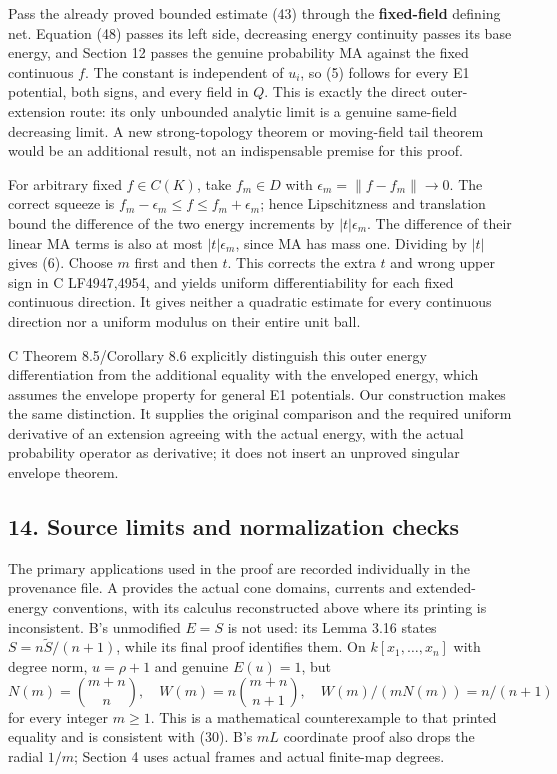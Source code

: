 \documentclass[
  10pt,
]{article}
\begin{document}
Pass the already proved bounded estimate (43) through the
\textbf{fixed-field} defining net. Equation (48) passes its left side,
decreasing energy continuity passes its base energy, and Section 12
passes the genuine probability MA against the fixed continuous \(f\).
The constant is independent of \(u_i\), so (5) follows for every E1
potential, both signs, and every field in \(Q\). This is exactly the
direct outer-extension route: its only unbounded analytic limit is a
genuine same-field decreasing limit. A new strong-topology theorem or
moving-field tail theorem would be an additional result, not an
indispensable premise for this proof.

For arbitrary fixed \(f\in C(K)\), take \(f_m\in D\) with
\(\epsilon_m=\|f-f_m\|\to0\). The correct squeeze is
\(f_m-\epsilon_m\leq f\leq f_m+\epsilon_m\); hence Lipschitzness and
translation bound the difference of the two energy increments by
\(|t|\epsilon_m\). The difference of their linear MA terms is also at
most \(|t|\epsilon_m\), since MA has mass one. Dividing by \(|t|\) gives
(6). Choose \(m\) first and then \(t\). This corrects the extra \(t\)
and wrong upper sign in C LF4947,4954, and yields uniform
differentiability for each fixed continuous direction. It gives neither
a quadratic estimate for every continuous direction nor a uniform
modulus on their entire unit ball.

C Theorem 8.5/Corollary 8.6 explicitly distinguish this outer energy
differentiation from the additional equality with the enveloped energy,
which assumes the envelope property for general E1 potentials. Our
construction makes the same distinction. It supplies the original
comparison and the required uniform derivative of an extension agreeing
with the actual energy, with the actual probability operator as
derivative; it does not insert an unproved singular envelope theorem.

\subsection{14. Source limits and normalization
checks}\label{source-limits-and-normalization-checks}

The primary applications used in the proof are recorded individually in
the provenance file. A provides the actual cone domains, currents and
extended-energy conventions, with its calculus reconstructed above where
its printing is inconsistent. B's unmodified \(E=S\) is not used: its
Lemma 3.16 states \(S=n\widetilde S/(n+1)\), while its final proof
identifies them. On \(k[x_1,\ldots,x_n]\) with degree norm, \(u=\rho+1\)
and genuine \(E(u)=1\), but
\[ N(m)=\binom{m+n}{n},\quad W(m)=n\binom{m+n}{n+1},\quad W(m)/(mN(m))=n/(n+1) \]
for every integer \(m\geq1\). This is a mathematical counterexample to
that printed equality and is consistent with (30). B's \(mL\) coordinate
proof also drops the radial \(1/m\); Section 4 uses actual frames and
actual finite-map degrees.
\end{document}
